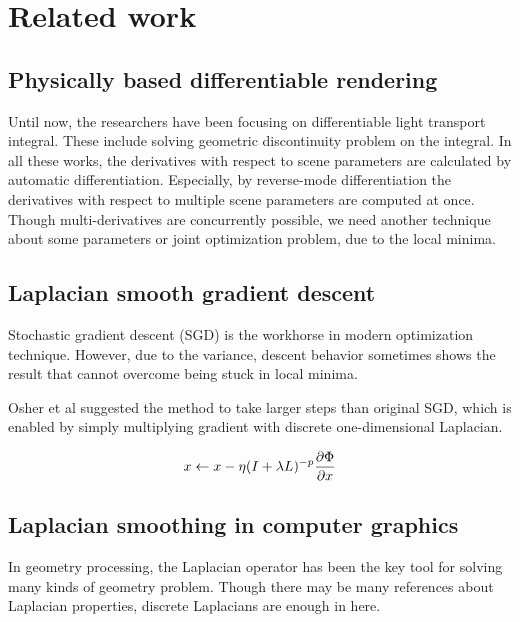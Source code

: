 \section*{Related work}\label{ch:ch2label}

\subsection*{Physically based differentiable rendering}

Until now, the researchers have been focusing on differentiable light transport integral.
These include solving geometric discontinuity problem on the integral\cite{li2018differentiable, loubet2019reparameterizing, zhang2020path}. In all these works, the derivatives with respect to scene parameters are calculated by automatic differentiation. Especially, by reverse-mode differentiation the derivatives with respect to multiple scene parameters are computed at once. Though multi-derivatives are concurrently possible, we need another technique about some parameters or joint optimization problem, due to the local minima.

\subsection*{Laplacian smooth gradient descent}

Stochastic gradient descent (SGD) is the workhorse in modern optimization technique. However, due to the variance, descent behavior sometimes shows the result that cannot overcome being stuck in local minima. 

Osher et al\cite{osher2018laplacian} suggested the method to take larger steps than original SGD, which is enabled by simply multiplying gradient with discrete one-dimensional Laplacian.

\begin{align}{\label{eq:1}}
	x \leftarrow x - \eta (I + \lambda L)^{-p} {\frac{\partial \Phi}{\partial x}}
\end{align}

\subsection*{Laplacian smoothing in computer graphics}

In geometry processing, the Laplacian operator has been the key tool for solving many kinds of geometry problem. Though there may be many references about Laplacian properties, discrete Laplacians are enough in here.

